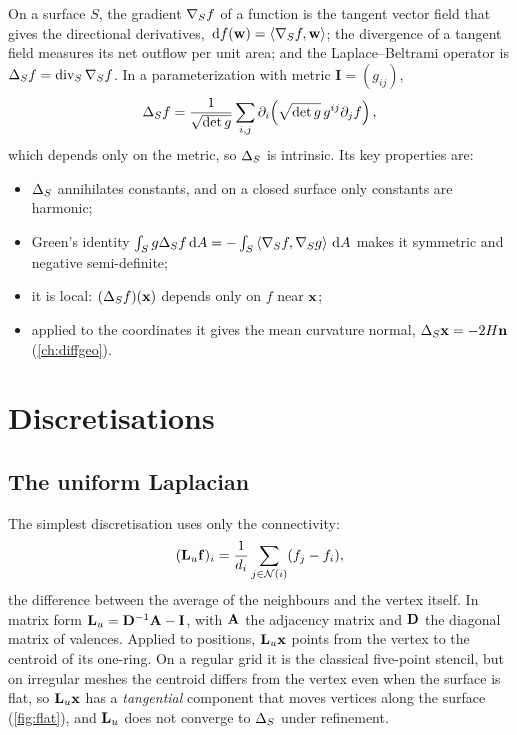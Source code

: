 On a surface $S$, the gradient $\nabla_Sf$ of a function is the tangent vector field that gives the
directional derivatives, $\,\mathrm{d} f(\mathbf{w})=\left\langle \nabla_Sf,\mathbf{w}\right\rangle$; the divergence of a tangent field
measures its net outflow per unit area; and the Laplace--Beltrami operator is
$\Delta_Sf=\operatorname{div}_S\nabla_Sf$. In a parameterization with metric $\mathbf I=(g_{ij})$,
\begin{equation}
\Delta_Sf=\frac{1}{\sqrt{\det g}}\sum_{i,j}\partial_i\!\left(\sqrt{\det g}\,g^{ij}\partial_jf\right),
\end{equation}
which depends only on the metric, so $\Delta_S$ is intrinsic. Its key properties are:
\begin{itemize}
  \item $\Delta_S$ annihilates constants, and on a closed surface only constants are harmonic;
  \item Green's identity $\int_Sg\Delta_Sf\,\mathrm{d} A=-\int_S\left\langle \nabla_Sf,\nabla_Sg\right\rangle\,\mathrm{d} A$ makes it
  symmetric and negative semi-definite;
  \item it is local: $(\Delta_Sf)(\mathbf{x})$ depends only on $f$ near $\mathbf{x}$;
  \item applied to the coordinates it gives the mean curvature normal, $\Delta_S\mathbf{x}=-2H\mathbf{n}$
  (\cref{ch:diffgeo}).
\end{itemize}

\section{Discretisations}

\subsection{The uniform Laplacian}

The simplest discretisation uses only the connectivity:
\begin{equation}
(\mathbf{L}_u\mathbf{f})_i=\frac1{d_i}\sum_{j\in\mathcal N(i)}(f_j-f_i),
\end{equation}
the difference between the average of the neighbours and the vertex itself. In matrix form
$\mathbf{L}_u=\mathbf{D}^{-1}\mathbf{A}-\mathbf{I}$, with $\mathbf{A}$ the adjacency matrix and $\mathbf{D}$ the diagonal matrix of
valences. Applied to positions, $\mathbf{L}_u\mathbf{x}$ points from the vertex to the centroid of its
one-ring. On a regular grid it is the classical five-point stencil, but on irregular meshes the
centroid differs from the vertex even when the surface is flat, so $\mathbf{L}_u\mathbf{x}$ has a
\emph{tangential} component that moves vertices along the surface (\cref{fig:flat}), and $\mathbf{L}_u$
does not converge to $\Delta_S$ under refinement.

